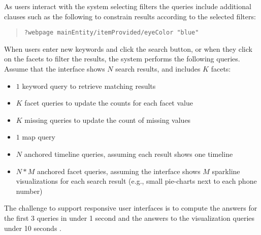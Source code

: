 As users interact with the system selecting filters the queries include additional clauses such as the following to constrain results according to the selected filters:
\begin{quote}
{\footnotesize
\begin{verbatim}
?webpage mainEntity/itemProvided/eyeColor "blue"
\end{verbatim}}
\end{quote}

When users enter new keywords and click the search button, or when they click on the facets to filter the results, the system performs the following queries.
Assume that the interface shows $N$ search results, and includes $K$ facets:
\begin{itemize}
\item $1$ keyword query to retrieve matching results
\item $K$ facet queries to update the counts for each facet value
\item $K$ missing queries to update the count of missing values
\item $1$ map query
\item $N$ anchored timeline queries, assuming each result shows one timeline
\item $N*M$ anchored facet queries, assuming the interface shows $M$ sparkline visualizations for each search result (e.g., small pie-charts next to each phone number) 
\end{itemize}
The challenge to support responsive user interfaces is to compute the answers for the first 3 queries in under 1 second and the answers to the visualization queries under 10 seconds \cite{nielsen1994usability}.